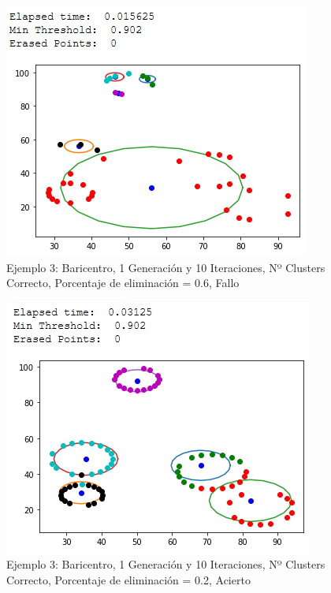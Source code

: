 \documentclass[conference,a4paper]{IEEEtran}
\begin{document}
\begin{figure}[H]
\centering
\includegraphics[scale=0.65]{Experimentacion/Ejemplo3/ej3_b_1_10_me}
\caption{Ejemplo 3: Baricentro, 1 Generación y 10 Iteraciones,  Nº Clusters Correcto, Porcentaje de eliminación = 0.6, Fallo\\}
\end{figure}

\begin{figure}[H]
\centering
\includegraphics[scale=0.65]{Experimentacion/Ejemplo3/ej3_b_1_10_le_correct}
\caption{Ejemplo 3: Baricentro, 1 Generación y 10 Iteraciones,  Nº Clusters Correcto, Porcentaje de eliminación = 0.2, Acierto\\}
\end{figure}
\end{document}
